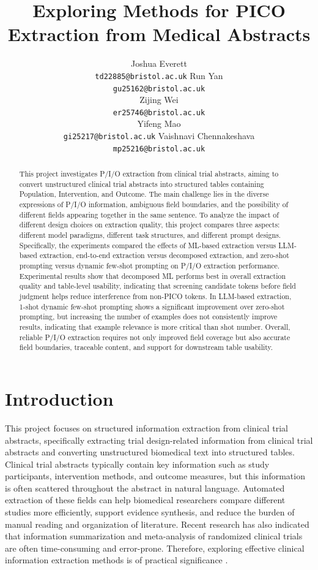 \documentclass{article}
\title{Exploring Methods for PICO Extraction from Medical Abstracts}
\author{
    Joshua Everett \\
    \texttt{td22885@bristol.ac.uk}
    \And
    Run Yan \\
    \texttt{gu25162@bristol.ac.uk} \\
    \And
    Zijing Wei \\
    \texttt{er25746@bristol.ac.uk} \\
    \And
    Yifeng Mao \\
    \texttt{gi25217@bristol.ac.uk}
    \And
    Vaishnavi Chennakeshava \\
    \texttt{mp25216@bristol.ac.uk} \\
}
\begin{document}
\maketitle
\vspace{-2em}

\begin{abstract}
This project investigates P/I/O extraction from clinical trial abstracts, aiming to convert unstructured clinical trial abstracts into structured tables containing Population, Intervention, and Outcome. The main challenge lies in the diverse expressions of P/I/O information, ambiguous field boundaries, and the possibility of different fields appearing together in the same sentence. To analyze the impact of different design choices on extraction quality, this project compares three aspects: different model paradigms, different task structures, and different prompt designs. Specifically, the experiments compared the effects of ML-based extraction versus LLM-based extraction, end-to-end extraction versus decomposed extraction, and zero-shot prompting versus dynamic few-shot prompting on P/I/O extraction performance. Experimental results show that decomposed ML performs best in overall extraction quality and table-level usability, indicating that screening candidate tokens before field judgment helps reduce interference from non-PICO tokens. In LLM-based extraction, 1-shot dynamic few-shot prompting shows a significant improvement over zero-shot prompting, but increasing the number of examples does not consistently improve results, indicating that example relevance is more critical than shot number. Overall, reliable P/I/O extraction requires not only improved field coverage but also accurate field boundaries, traceable content, and support for downstream table usability.
\end{abstract}

\section{Introduction}
This project focuses on structured information extraction from clinical trial abstracts, specifically extracting trial design-related information from clinical trial abstracts and converting unstructured biomedical text into structured tables. Clinical trial abstracts typically contain key information such as study participants, intervention methods, and outcome measures, but this information is often scattered throughout the abstract in natural language. Automated extraction of these fields can help biomedical researchers compare different studies more efficiently, support evidence synthesis, and reduce the burden of manual reading and organization of literature. Recent research has also indicated that information summarization and meta-analysis of randomized clinical trials are often time-consuming and error-prone. Therefore, exploring effective clinical information extraction methods is of practical significance \cite{kartchner_zero-shot_2023}.
\end{document}
